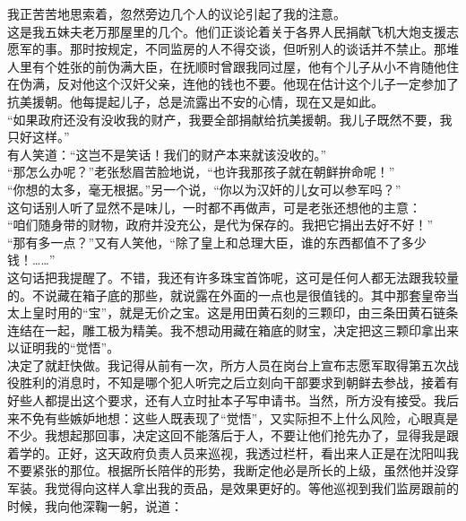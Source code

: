 我正苦苦地思索着，忽然旁边几个人的议论引起了我的注意。\\

这是我五妹夫老万那屋里的几个。他们正谈论着关于各界人民捐献飞机大炮支援志愿军的事。那时按规定，不同监房的人不得交谈，但听别人的谈话并不禁止。那堆人里有个姓张的前伪满大臣，在抚顺时曾跟我同过屋，他有个儿子从小不肯随他住在伪满，反对他这个汉奸父亲，连他的钱也不要。他现在估计这个儿子一定参加了抗美援朝。他每提起儿子，总是流露出不安的心情，现在又是如此。\\

“如果政府还没有没收我的财产，我要全部捐献给抗美援朝。我儿子既然不要，我只好这样。”\\

有人笑道：“这岂不是笑话！我们的财产本来就该没收的。”\\

“那怎么办呢？”老张愁眉苦脸地说，“也许我那孩子就在朝鲜拚命呢！”\\

“你想的太多，毫无根据。”另一个说，“你以为汉奸的儿女可以参军吗？”\\

这句话别人听了显然不是味儿，一时都不再做声，可是老张还想他的主意：\\

“咱们随身带的财物，政府并没充公，是代为保存的。我把它捐出去好不好！”\\

“那有多一点？”又有人笑他，“除了皇上和总理大臣，谁的东西都值不了多少钱！……”\\

这句话把我提醒了。不错，我还有许多珠宝首饰呢，这可是任何人都无法跟我较量的。不说藏在箱子底的那些，就说露在外面的一点也是很值钱的。其中那套皇帝当太上皇时用的“宝”，就是无价之宝。这是用田黄石刻的三颗印，由三条田黄石链条连结在一起，雕工极为精美。我不想动用藏在箱底的财宝，决定把这三颗印拿出来以证明我的“觉悟”。\\

决定了就赶快做。我记得从前有一次，所方人员在岗台上宣布志愿军取得第五次战役胜利的消息时，不知是哪个犯人听完之后立刻向干部要求到朝鲜去参战，接着有好些人都提出这个要求，还有人立时扯本子写申请书。当然，所方没有接受。我后来不免有些嫉妒地想：这些人既表现了“觉悟”，又实际担不上什么风险，心眼真是不少。我想起那回事，决定这回不能落后于人，不要让他们抢先办了，显得我是跟着学的。正好，这天政府负责人员来巡视，我透过栏杆，看出来人正是在沈阳叫我不要紧张的那位。根据所长陪伴的形势，我断定他必是所长的上级，虽然他并没穿军装。我觉得向这样人拿出我的贡品，是效果更好的。等他巡视到我们监房跟前的时候，我向他深鞠一躬，说道：\\

